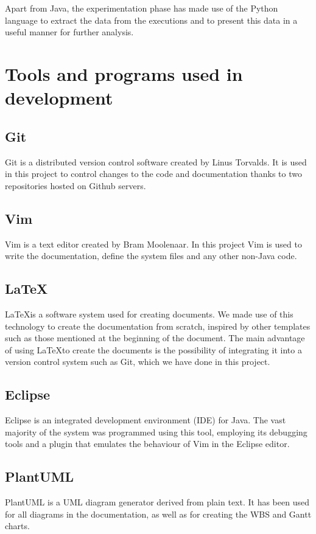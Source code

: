 Apart from Java, the experimentation phase has made use of the Python language to extract the data from the executions and to present this data in a useful manner for further analysis.

\section{Tools and programs used in development}

\subsection{Git}

Git is a distributed version control software created by Linus Torvalds. It is used in this project to control changes to the code and documentation thanks to two repositories hosted on Github servers. 

\subsection{Vim}

Vim is a text editor created by Bram Moolenaar. In this project Vim is used to write the documentation, define the system files and any other non-Java code.

\subsection{\LaTeX}

\LaTeX is a software system used for creating documents. We made use of this technology to create the documentation from scratch, inspired by other templates such as those mentioned at the beginning of the document. The main advantage of using \LaTeX to create the documents is the possibility of integrating it into a version control system such as Git, which we have done in this project. 

\subsection{Eclipse}

Eclipse is an integrated development environment (IDE) for Java. The vast majority of the system was programmed using this tool, employing its debugging tools and a plugin that emulates the behaviour of Vim in the Eclipse editor.

\subsection{PlantUML}

PlantUML is a UML diagram generator derived from plain text. It has been used for all diagrams in the documentation, as well as for creating the WBS and Gantt charts.


